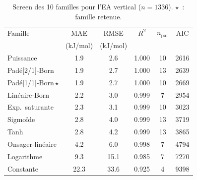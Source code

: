 \begin{table}[htbp]
\centering\footnotesize
\caption{Screen des 10 familles pour l'EA vertical ($n=1336$). $\star$~: famille retenue.}
\label{tab:ms_ea_families}
\begin{tabular}{lccccc}
\toprule
Famille & MAE & RMSE & $R^2$ & $n_{\mathrm{par}}$ & AIC \\
 & (kJ/mol) & (kJ/mol) & & & \\
\midrule
Puissance & 1.9 & 2.6 & 1.000 & 10 & 2616 \\
Padé[2/1]-Born & 1.9 & 2.7 & 1.000 & 13 & 2639 \\
Padé[1/1]-Born\,$\star$ & 1.9 & 2.7 & 1.000 & 10 & 2669 \\
Linéaire-Born & 2.2 & 3.0 & 0.999 & 7 & 2954 \\
Exp.\ saturante & 2.3 & 3.1 & 0.999 & 10 & 3023 \\
Sigmoïde & 2.8 & 4.0 & 0.999 & 13 & 3719 \\
Tanh & 2.8 & 4.2 & 0.999 & 13 & 3865 \\
Onsager-linéaire & 4.2 & 6.0 & 0.998 & 7 & 4794 \\
Logarithme & 9.3 & 15.1 & 0.985 & 7 & 7270 \\
Constante & 22.3 & 33.6 & 0.925 & 4 & 9398 \\
\bottomrule
\end{tabular}
\end{table}